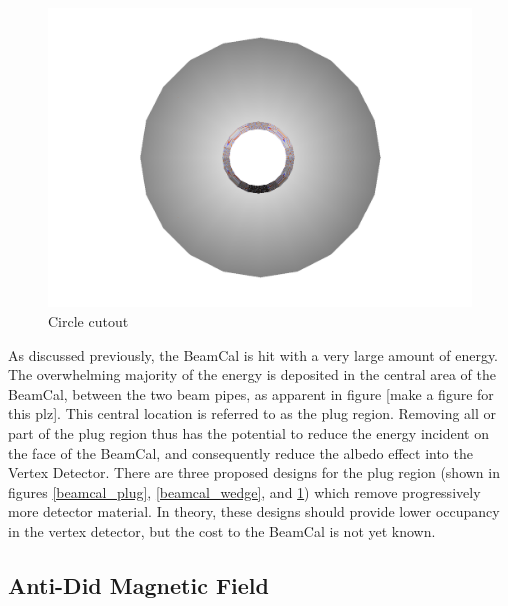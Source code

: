 \documentclass{report}
\begin{document}
\begin{figure}[h]
\begin{minipage}{0.3\textwidth}
                        \label{beamcal_wedge}
                    \end{minipage}
                    \begin{minipage}{0.3\textwidth}
                        \includegraphics[width=\textwidth]{beamcal_circle}
                        \caption{Circle cutout}
                        \label{beamcal_circle}
                    \end{minipage}
                \end{figure}

                As discussed previously, the BeamCal is hit with a very large amount of energy. The overwhelming majority of the energy is deposited in the central area of the BeamCal, between the two beam pipes, as apparent in figure [make a figure for this plz]. This central location is referred to as the plug region. Removing all or part of the plug region thus has the potential to reduce the energy incident on the face of the BeamCal, and consequently reduce the albedo effect into the Vertex Detector. There are three proposed designs for the plug region (shown in figures \ref{beamcal_plug}, \ref{beamcal_wedge}, and \ref{beamcal_circle}) which remove progressively more detector material. In theory, these designs should provide lower occupancy in the vertex detector, but the cost to the BeamCal is not yet known.


            \subsection{Anti-Did Magnetic Field}
\end{document}
